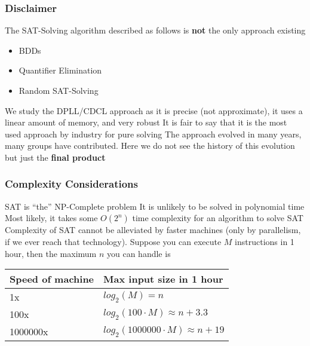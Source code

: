 \begin{frame}
  \frametitle{Disclaimer}

  The SAT-Solving algorithm described as follows is {\bf not} the
  only approach existing
  \begin{itemize}
    \item BDDs
    \item Quantifier Elimination
    \item Random SAT-Solving
  \end{itemize}
  \vfill
  We study the DPLL/CDCL approach as it is precise (not approximate),
  it uses a linear amount of memory, and very robust
  \vfill
  It is fair to say that it is the most used approach by industry
  for pure solving
  \vfill
  The approach evolved in many years, many groups have contributed. Here
  we do not see the history of this evolution but just the {\bf final product} 

\end{frame}

\begin{frame}
  \frametitle{Complexity Considerations}

  SAT is ``the'' NP-Complete problem
  \vfill
  It is unlikely to be solved in polynomial time
  \vfill 
  Most likely, it takes some $O(2^n)$ time complexity
  for an algorithm to solve SAT
  \vfill 
  Complexity of SAT cannot be alleviated by faster
  machines (only by parallelism, if we ever reach
  that technology). Suppose you can execute $M$ instructions
  in 1 hour, then the maximum $n$ you can handle is
  \vfill
  \begin{center}
  \begin{tabular}{ll}
    \hline
    Speed of machine & Max input size in 1 hour \\
    \hline
    1x               & $log_2(M) = n$ \\
    100x             & $log_2(100 \cdot M) \approx n + 3.3$ \\
    1000000x         & $log_2(1000000 \cdot M) \approx n + 19$ \\
    \hline
  \end{tabular}
  \end{center}

\end{frame}

